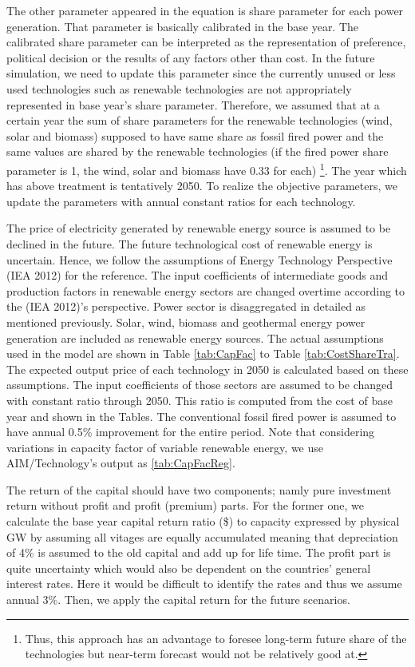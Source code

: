 \documentclass[10pt,a4paper,titlepage,dvipdfmx]{book}
\begin{document}
The other parameter appeared in the equation is share parameter for each power generation. That parameter is basically calibrated in the base year. The calibrated share parameter can be interpreted as the representation of preference, political decision or the results of any factors other than cost. In the future simulation, we need to update this parameter since the currently unused or less used technologies such as renewable technologies are not appropriately represented in base year's share parameter. Therefore, we assumed that at a certain year the sum of share parameters for the renewable technologies (wind, solar and biomass) supposed to have same share as fossil fired power and the same values are shared by the renewable technologies (if the fired power share parameter is 1, the wind, solar and biomass have 0.33 for each) \footnote{Thus, this approach has an advantage to foresee long-term future share of the technologies but near-term forecast would not be relatively good at.}. The year which has above treatment is tentatively 2050. To realize the objective parameters, we update the parameters with annual constant ratios for each technology.

The price of electricity generated by renewable energy source is assumed to be declined in the future. The future technological cost of renewable energy is uncertain. Hence, we follow the assumptions of Energy Technology Perspective (IEA 2012) for the reference. The input coefficients of intermediate goods and production factors in renewable energy sectors are changed overtime according to the (IEA 2012)'s perspective. Power sector is disaggregated in detailed as mentioned previously. Solar, wind, biomass and geothermal energy power generation are included as renewable energy sources. The actual assumptions used in the model are shown in Table \ref{tab:CapFac} to Table \ref{tab:CostShareTra}. The expected output price of each technology in 2050 is calculated based on these assumptions. The input coefficients of those sectors are assumed to be changed with constant ratio through 2050. This ratio is computed from the cost of base year and shown in the Tables. The conventional fossil fired power is assumed to have annual 0.5\% improvement for the entire period. Note that considering variations in capacity factor of variable renewable energy, we use AIM/Technology's output as \ref{tab:CapFacReg}.

{The return of the capital should have two components; namly pure investment return without profit and profit (premium) parts. For the former one, we calculate the base year capital return ratio (\$) to capacity expressed by physical GW by assuming all vitages are equally accumulated meaning that depreciation of 4\% is assumed to the old capital and add up for life time. The profit part is quite uncertainty which would also be dependent on the countries' general interest rates. Here it would be difficult to identify the rates and thus we assume annual 3\%. Then, we apply the capital return for the future scenarios.}
\end{document}
